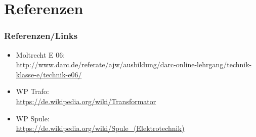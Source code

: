 \section*{Referenzen}

\begin{frame}
    \frametitle{Referenzen/Links}
    
    \footnotesize
    \begin{itemize}
        \item Moltrecht E 06: \\
              \url{http://www.darc.de/referate/ajw/ausbildung/darc-online-lehrgang/technik-klasse-e/technik-e06/}
         \item WP Trafo: \\
              \url{https://de.wikipedia.org/wiki/Transformator}
 		\item WP Spule: \\
              \url{https://de.wikipedia.org/wiki/Spule_(Elektrotechnik)}
    \end{itemize}

\end{frame}


